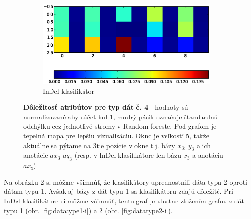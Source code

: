 \begin{figure}[htp]
\begin{subfigure}[t]{0.4\textwidth}
                \includegraphics[width=\textwidth]{images/clf_fi/randomforest_combined_5_indel_heatmap}
                \caption{InDel klasifikátor}
                \label{fig:datatype4-i}
        \end{subfigure}
        \caption[Dôležitosť atribútov pre typ dát č. 4]{
        \textbf{Dôležitosť atribútov pre typ dát č. 4} - hodnoty sú normalizované aby súčet bol 1, modrý pásik označuje štandardnú odchýlku cez jednotlivé stromy v Random foreste.
        Pod grafom je tepelná mapa pre lepšiu vizualizáciu. Okno je veľkosti 5, takže aktuálne sa pýtame na 3tie pozície v okne t.j. bázy $x_3$, $y_3$ a ich anotácie $ax_3$ $ay_3$ (resp. v InDel klasifikátore len bázu $x_3$ a anotáciu $ax_3$)
        }
        \label{fig:datatype4}
\end{figure}


Na obrázku \ref{fig:datatype4} si môžme všimnúť, že klasifikátory uprednostnili dáta typu 2 oproti dátam typu 1.
Avšak aj bázy z dát typu 1 sa klasifikátoru zdajú dôležité.
Pri InDel klasifikátore si môžme všimnúť, tento graf je vlastne zložením grafov z dát typu 1 (obr. \ref{fig:datatype1-i}) a 2 (obr. \ref{fig:datatype2-i}).

